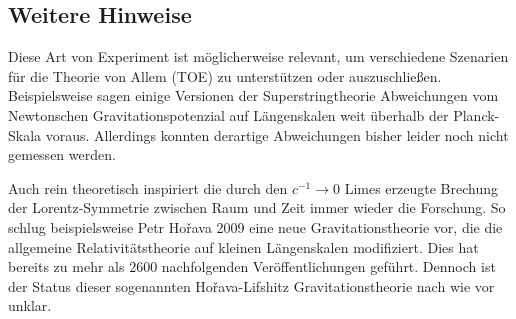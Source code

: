 \subsection*{Weitere Hinweise}

Diese Art von Experiment ist möglicherweise relevant, um verschiedene Szenarien für die Theorie von Allem (TOE) zu unterstützen oder auszuschließen. Beispielsweise sagen einige Versionen der Superstringtheorie Abweichungen vom Newtonschen Gravitationspotenzial auf Längenskalen weit überhalb der Planck-Skala voraus. Allerdings konnten derartige Abweichungen bisher leider noch nicht gemessen werden.

Auch rein theoretisch inspiriert die durch den $c^{−1}\rightarrow 0$ Limes erzeugte Brechung der Lorentz-Symmetrie zwischen Raum und Zeit immer wieder die Forschung. So schlug beispielsweise Petr Hořava 2009 eine neue Gravitationstheorie vor, die die allgemeine Relativitätstheorie auf kleinen Längenskalen modifiziert. Dies hat bereits zu mehr als \num{2600} nachfolgenden Veröffentlichungen geführt. Dennoch ist der Status dieser sogenannten Hořava-Lifshitz Gravitationstheorie nach wie vor unklar.
